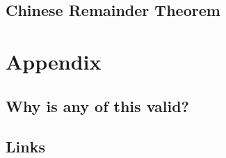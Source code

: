 \documentclass{article}
\begin{document}
\subsection{Chinese Remainder Theorem}

\section{}

\section{Appendix}

\subsection{Why is any of this valid?}

\subsection{Links}
\end{document}
